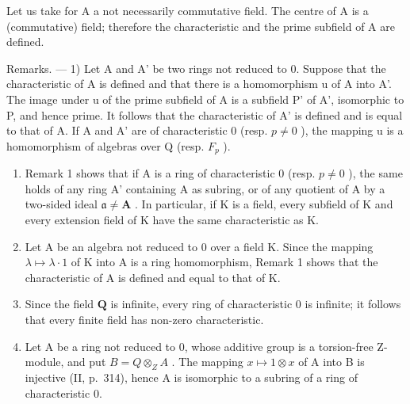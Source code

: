Let us take for A a not necessarily commutative field. The centre of A is a (commutative) field; therefore the characteristic and the prime subfield of A are defined.

Remarks. --- 1) Let A and A' be two rings not reduced to 0. Suppose that the characteristic of A is defined and that there is a homomorphism u of A into A'. The image under u of the prime subfield of A is a subfield P' of A', isomorphic to P, and hence prime. It follows that the characteristic of A' is defined and is equal to that of A. If A and A' are of characteristic 0 (resp. \(p \neq 0\) ), the mapping u is a homomorphism of algebras over Q (resp. \(F_{p}\) ).

\begin{enumerate}
\def\labelenumi{\arabic{enumi})}
\setcounter{enumi}{1}
\item
  Remark 1 shows that if A is a ring of characteristic 0 (resp. \(p \neq 0\) ), the same holds of any ring A' containing A as subring, or of any quotient of A by a two-sided ideal \(\mathfrak{a} \neq \mathbf{A}\) . In particular, if K is a field, every subfield of K and every extension field of K have the same characteristic as K.
\item
  Let A be an algebra not reduced to 0 over a field K. Since the mapping \(\lambda \mapsto \lambda \cdot 1\) of K into A is a ring homomorphism, Remark 1 shows that the characteristic of A is defined and equal to that of K.
\item
  Since the field \(\mathbf{Q}\) is infinite, every ring of characteristic 0 is infinite; it follows that every finite field has non-zero characteristic.
\item
  Let A be a ring not reduced to 0, whose additive group is a torsion-free Z-module, and put \(B = Q \otimes_{Z} A\) . The mapping \(x \mapsto 1 \otimes x\) of A into B is injective (II, p.~314), hence A is isomorphic to a subring of a ring of characteristic 0.
\end{enumerate}

